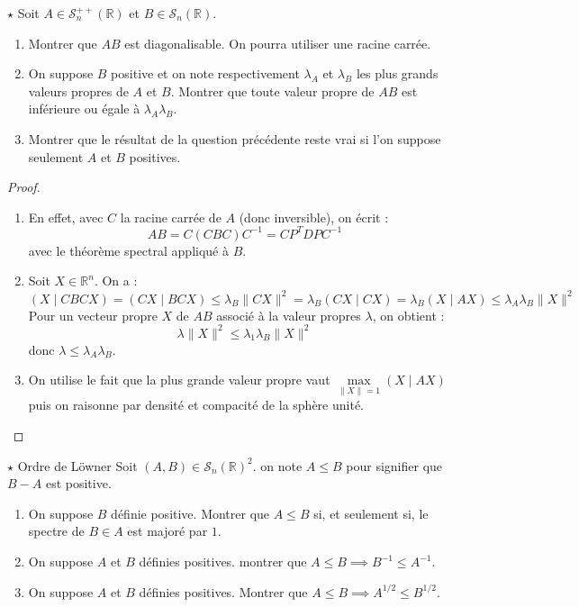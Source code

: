 \documentclass[french,a4paper]{article}
\newcommand{\R}{\mathbb{R}}
\newcommand{\inv}{^{-1}}
\theoremstyle{plain}
\theoremstyle{definition}
\theoremstyle{remark}
\begin{document}
\begin{ex}{$\star$}
	Soit $A\in\mathcal{S}_n^{++}(\R)$ et $B\in\mathcal{S}_n(\R)$.
	\begin{enumerate}
		\item Montrer que $AB$ est diagonalisable. On pourra utiliser une racine carrée.
		\item On suppose $B$ positive et on note respectivement $\lambda_A$ et $\lambda_B$ les plus grands valeurs propres de $A$ et $B$. Montrer que toute valeur propre de $AB$ est inférieure ou égale à $\lambda_A\lambda_B$.
		\item Montrer que le résultat de la question précédente reste vrai si l'on suppose seulement $A$ et $B$ positives. 
	\end{enumerate}
\end{ex}
\begin{proof}
	\begin{enumerate}
		\item En effet, avec $C$ la racine carrée de $A$ (donc inversible), on écrit : $$AB=C(CBC)C\inv=CP^T DPC\inv$$ avec le théorème spectral appliqué à $B$.
		\item Soit $X\in\R^n$. On a : $$(X\mid CBCX)=(CX\mid BCX)\leqslant\lambda_B\lVert CX\rVert^2=\lambda_B(CX\mid CX)=\lambda_B(X\mid AX)\leqslant \lambda_A\lambda_B\lVert X\rVert^2$$ Pour un vecteur propre $X$ de $AB$ associé à la valeur propres $\lambda$, on obtient : $$\lambda\lVert X\rVert^2\leqslant\lambda_1\lambda_B\lVert X\rVert^2$$ donc $\lambda\leqslant\lambda_A\lambda_B$.
		\item On utilise le fait que la plus grande valeur propre vaut $\displaystyle\underset{\lVert X\rVert=1}{\max}(X\mid AX)$ puis on raisonne par densité et compacité de la sphère unité.
	\end{enumerate}
\end{proof}

\begin{ex}{$\star$ Ordre de Löwner}
	Soit $(A,B)\in\mathcal{S}_n(\R)^2$. on note $A\leqslant B$ pour signifier que $B-A$ est positive.
	\begin{enumerate}
		\item On suppose $B$ définie positive. Montrer que $A\leqslant B$ si, et seulement si, le spectre de $B\in A$ est majoré par $1$.
		\item On suppose $A$ et $B$ définies positives. montrer que $A\leqslant B\implies B\inv\leqslant A\inv$.
		\item On suppose $A$ et $B$ définies positives. Montrer que $A\leqslant B\implies A^{1/2}\leqslant B^{1/2}$.
	\end{enumerate}
\end{ex}
\end{document}
